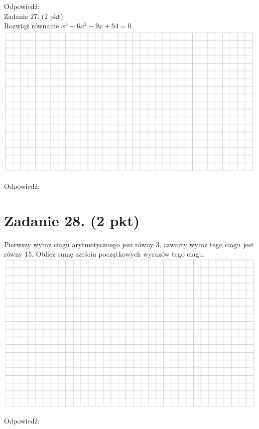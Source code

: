 \documentclass[10pt]{article}
\begin{document}
Odpowiedź:\\
Zadanie 27. (2 pkt)\\
Rozwiąż równanie \(x^{3}-6 x^{2}-9 x+54=0\).\\
\includegraphics[max width=\textwidth, center]{2024_11_21_6a8be49478f78d0689cfg-10}

Odpowiedź:

\section*{Zadanie 28. (2 pkt)}
Pierwszy wyraz ciagu arytmetycznego jest równy 3, czwarty wyraz tego ciagu jest równy 15. Oblicz sumę sześciu początkowych wyrazów tego ciagu.\\
\includegraphics[max width=\textwidth, center]{2024_11_21_6a8be49478f78d0689cfg-11(1)}

Odpowiedź:
\end{document}
